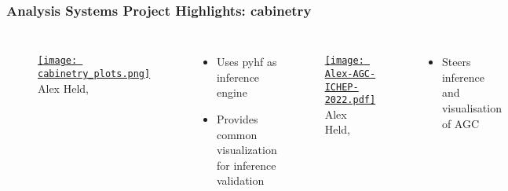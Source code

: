 \begin{frame}
  \frametitle{Analysis Systems Project Highlights: cabinetry}

  \begin{columns}
    \begin{figure}
        \begin{center}
            \href{https://indico.cern.ch/event/1056428/contributions/4523825/}{\texttt{[image: cabinetry\_plots.png]}}
            Alex Held, 
        \end{center}
    \end{figure}
    \begin{itemize}
      \item Uses pyhf as inference engine
      \item Provides common visualization for inference validation
    \end{itemize}
%
    \begin{figure}
        \begin{center}
            \href{https://agenda.infn.it/event/28874/contributions/169204/}{\texttt{[image: Alex-AGC-ICHEP-2022.pdf]}}
            Alex Held, 
        \end{center}
    \end{figure}
    \begin{itemize}
      \item Steers inference and visualisation of AGC
    \end{itemize}
  \end{columns}

\end{frame}

